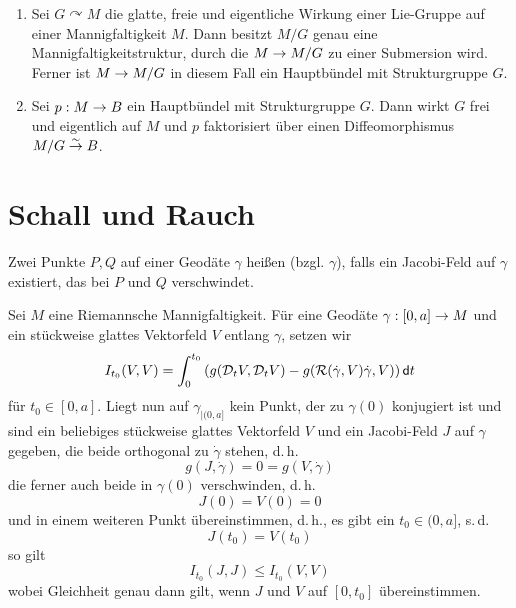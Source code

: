 \documentclass{book}
\renewcommand{\d}{\textsf{d}}
\newcommand{\Rc}{\mathcal{R}}
\begin{document}
\Satz{}
\begin{enumerate}[1.)]
\item Sei $G\curvearrowright M$ die glatte, freie und eigentliche Wirkung einer Lie-Gruppe auf einer Mannigfaltigkeit $M$. Dann besitzt $M/G$ genau eine Mannigfaltigkeitstruktur, durch die $M \overset{}{\rightarrow} M/G$ zu einer Submersion wird. Ferner ist $M\overset{}{\rightarrow} M/G$ in diesem Fall ein Hauptbündel mit Strukturgruppe $G$.
\item Sei $p : M \overset{}{\rightarrow} B$ ein Hauptbündel mit Strukturgruppe $G$. Dann wirkt $G$ frei und eigentlich auf $M$ und $p$ faktorisiert über einen Diffeomorphismus $M/G \overset{\sim}{\rightarrow} B$.
\end{enumerate}

\newpage
\section{Schall und Rauch}
Zwei Punkte $P,Q$ auf einer Geodäte $\gamma$ heißen  (bzgl. $\gamma$), falls ein Jacobi-Feld auf $\gamma$ existiert, das bei $P$ und $Q$ verschwindet.

Sei $M$ eine Riemannsche Mannigfaltigkeit. Für eine Geodäte $\gamma : [0,a] \overset{}{\rightarrow} M$ und ein stückweise glattes Vektorfeld $V$ entlang $\gamma$, setzen wir
\[ I_{t_0}(V,V) = \int_{0}^{t_0} \klam{ g(\D_tV, \D_tV) - g(\Rc(\dot{\gamma}, V)\dot{\gamma}, V ) } \d t \]
für $t_0 \in [0,a]$. Liegt nun auf $\gamma_{|(0,a]}$ kein Punkt, der zu $\gamma(0)$ konjugiert ist und sind ein beliebiges stückweise glattes Vektorfeld $V$ und ein Jacobi-Feld $J$ auf $\gamma$ gegeben, die beide orthogonal zu $\dot{\gamma}$ stehen, d.\,h.
\[ g(J, \dot{\gamma}) = 0 = g(V, \dot{\gamma}) \]
die ferner auch beide in $\gamma(0)$ verschwinden, d.\,h.
\[ J(0) = V(0) = 0 \]
und in einem weiteren Punkt übereinstimmen, d.\,h., es gibt ein $t_0\in (0,a]$, s.\,d.
\[ J(t_0) = V(t_0) \]
so gilt
\[ I_{t_0}(J,J) \leq I_{t_0} (V,V) \]
wobei Gleichheit genau dann gilt, wenn $J$ und $V$ auf $[0,t_0]$ übereinstimmen.
\end{document}
